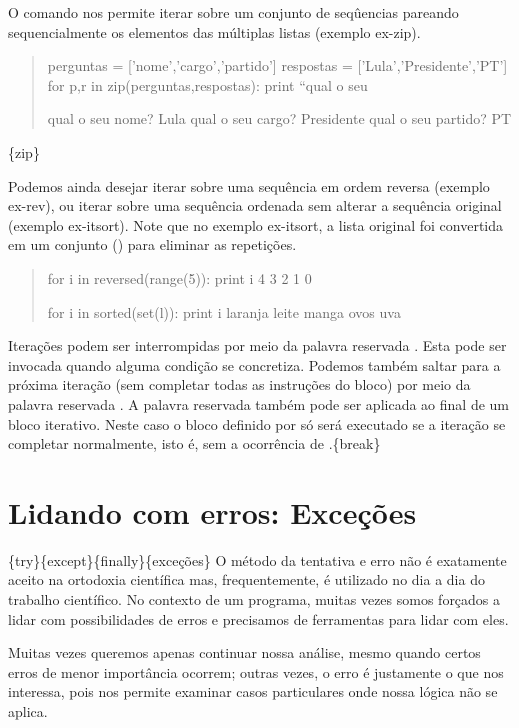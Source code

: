 \documentclass[a4paper,10pt,portuguese]{sphinxmanual}
\begin{document}
O comando  nos permite iterar sobre um conjunto de
seqûencias pareando sequencialmente os elementos das múltiplas
listas (exemplo ex-zip).
\begin{quote}

perguntas = {[}'nome','cargo','partido'{]} respostas =
{[}'Lula','Presidente','PT'{]} for p,r in zip(perguntas,respostas):
print ``qual o seu

qual o seu nome? Lula qual o seu cargo? Presidente qual o seu
partido? PT
\end{quote}

\{zip\}

Podemos ainda desejar iterar sobre uma sequência em ordem reversa
(exemplo ex-rev), ou iterar sobre uma sequência ordenada sem
alterar a sequência original (exemplo ex-itsort). Note que no
exemplo ex-itsort, a lista original foi convertida em um conjunto
() para eliminar as repetições.
\begin{quote}

for i in reversed(range(5)): print i 4 3 2 1 0

for i in sorted(set(l)): print i laranja leite manga ovos uva
\end{quote}

Iterações podem ser interrompidas por meio da palavra reservada
. Esta pode ser invocada quando alguma condição se
concretiza. Podemos também saltar para a próxima iteração (sem
completar todas as instruções do bloco) por meio da palavra
reservada . A palavra reservada  também pode
ser aplicada ao final de um bloco iterativo. Neste caso o bloco
definido por  só será executado se a iteração se completar
normalmente, isto é, sem a ocorrência de .\{break\}


\section{Lidando com erros: Exceções}
\label{Cap2:lidando-com-erros-excecoes}
\{try\}\{except\}\{finally\}\{exceções\} O método da tentativa e erro não é
exatamente aceito na ortodoxia científica mas, frequentemente, é
utilizado no dia a dia do trabalho científico. No contexto de um
programa, muitas vezes somos forçados a lidar com possibilidades de
erros e precisamos de ferramentas para lidar com eles.

Muitas vezes queremos apenas continuar nossa análise, mesmo quando
certos erros de menor importância ocorrem; outras vezes, o erro é
justamente o que nos interessa, pois nos permite examinar casos
particulares onde nossa lógica não se aplica.
\end{document}
